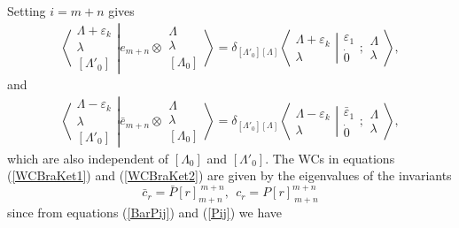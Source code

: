 \documentclass[12pt]{article}
\begin{document}
Setting $i=m+n$ gives
\begin{align}
\left\langle\left. 
\begin{array}{c} \Lambda+\varepsilon_k\\ \lambda \\ {[\Lambda'_0]} \end{array}
\right|\right.
\left.
e_{m+n} \otimes \begin{array}{c} \Lambda \\ \lambda \\
{[\Lambda_0]} \end{array}
\right\rangle = \delta_{[\Lambda'_0][\Lambda]}
 \left\langle\left. 
\begin{array}{c} \Lambda+\varepsilon_k\\ \lambda \end{array}
\right|\right.
\left.
\begin{array}{c} 
\varepsilon_1 \\ \dot{0}
\end{array}
;
\begin{array}{c} \Lambda \\
\lambda \end{array}
\right\rangle  , \label{WCBraKet1}
\end{align}
and
\begin{align}
\left\langle\left. 
\begin{array}{c} \Lambda-\varepsilon_k\\ \lambda \\ {[\Lambda'_0]} \end{array}
\right|\right.
\left.
\bar{e}_{m+n} \otimes \begin{array}{c} \Lambda \\ \lambda \\
{[\Lambda_0]} \end{array}
\right\rangle = \delta_{[\Lambda'_0][\Lambda]}
 \left\langle\left. 
\begin{array}{c} \Lambda-\varepsilon_k\\ \lambda \end{array}
\right|\right.
\left.
\begin{array}{c} 
\bar{\varepsilon}_1 \\ \dot{0}
\end{array}
;
\begin{array}{c} \Lambda \\
\lambda \end{array}
\right\rangle  , \label{WCBraKet2}
\end{align}
which are also independent of $[\Lambda_0]$ and $[\Lambda'_0]$. 
The WCs in equations (\ref{WCBraKet1}) and (\ref{WCBraKet2}) are given by the eigenvalues of the invariants
$$ 
\bar{c}_r = \bar{P}[r]_{m+n}^{\ m+n}, ~~c_r = P[r]_{\ m+n}^{m+n}
$$
since from equations (\ref{BarPij}) and (\ref{Pij}) we have
\end{document}
